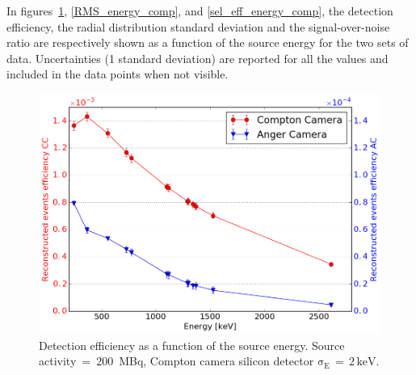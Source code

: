 In figures~\ref{eff_energy_comp}, \ref{RMS_energy_comp}, and \ref{sel_eff_energy_comp}, the detection efficiency, the radial distribution standard deviation and the signal-over-noise ratio are respectively shown as a function of the source energy for the two sets of data. Uncertainties (1 standard deviation) are reported for all the values and included in the data points when not visible.


\begin{figure}[h!]
\begin{center}
\hspace{0.4cm} \includegraphics[scale=0.4]{03_GraphicFiles/chapter4/SPECT/comparison/effVSenergy_overlap}
\caption{Detection efficiency as a function of the source energy. Source activity~=~200~MBq, Compton camera silicon detector $\mathrm{\sigma_{E}\,=\,2\,keV}$.}
\label{eff_energy_comp}
\end{center}
\end{figure}

